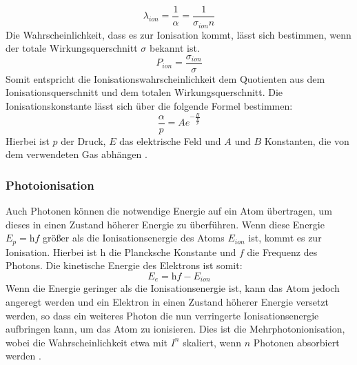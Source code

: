\begin{equation}
    \lambda_{ion} = \frac{1}{\alpha} = \frac{1}{\sigma_{ion} n}
    \label{eq:middelwaylen}
\end{equation}
Die Wahrscheinlichkeit, dass es zur Ionisation kommt, lässt sich bestimmen, wenn der totale Wirkungsquerschnitt \(\sigma\) bekannt ist.
\begin{equation}
    P_{ion} = \frac{\sigma_{ion}}{\sigma}
    \label{eq:ionizationprop}
\end{equation}
Somit entspricht die Ionisationswahrscheinlichkeit dem Quotienten aus dem Ionisationsquerschnitt und dem totalen Wirkungsquerschnitt. Die Ionisationskonstante lässt sich über die folgende Formel bestimmen:
\begin{equation}
    \frac{\alpha}{p} = A e^{-\frac{B}{\frac{E}{p}}}
    \label{eq:ionconst}
\end{equation}
Hierbei ist \(p\) der Druck, \(E\) das elektrische Feld und \(A\) und \(B\) Konstanten, die von dem verwendeten Gas abhängen \cite{cooray2014}.

\subsubsection{Photoionisation}
Auch Photonen können die notwendige Energie auf ein Atom übertragen, um dieses in einen Zustand höherer Energie zu überführen. Wenn diese Energie \(E_{p} = \mathrm{h}f\) größer als die Ionisationsenergie des Atoms \(E_{ion}\) ist, kommt es zur Ionisation. Hierbei ist \(\mathrm{h}\) die Plancksche Konstante und \(f\) die Frequenz des Photons. Die kinetische Energie des Elektrons ist somit:
\begin{equation}
    E_{e} = \mathrm{h}f - E_{ion}
    \label{eq:photoenergyion}
\end{equation}
Wenn die Energie geringer als die Ionisationsenergie ist, kann das Atom jedoch angeregt werden und ein Elektron in einen Zustand höherer Energie versetzt werden, so dass ein weiteres Photon die nun verringerte Ionisationsenergie aufbringen kann, um das Atom zu ionisieren. Dies ist die Mehrphotonionisation, wobei die Wahrscheinlichkeit etwa mit \(I^n\) skaliert, wenn \(n\) Photonen absorbiert werden \cite{kuffel2000}.

